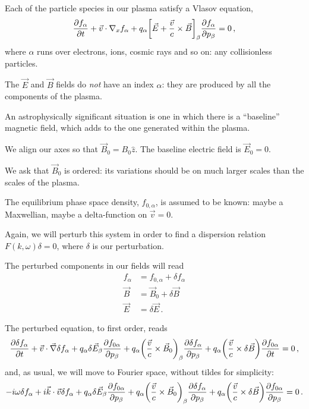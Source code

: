 \documentclass[main.tex]{subfiles}
\begin{document}

Each of the particle species in our plasma satisfy a Vlasov equation, 
%
\begin{align}
\pdv{f_\alpha }{t} + \vec{v} \cdot \nabla_x f_\alpha + q_\alpha \qty[ \vec{E} + \frac{\vec{v}}{c} \times \vec{B}]_\beta  \pdv{f_\alpha }{p_\beta } = 0
\,,
\end{align}
%
where \(\alpha \) runs over electrons, ions, cosmic rays and so on: any collisionless particles. 

The \(\vec{E}\) and \(\vec{B}\) fields do \emph{not} have an index \(\alpha\): they are produced by all the components of the plasma. 

An astrophysically significant situation is one in which there is a ``baseline'' magnetic field, which adds to the one generated within the plasma. 

We align our axes so that \(\vec{B}_0 = B_0  \hat{z}\). 
The baseline electric field is \(\vec{E}_0 = 0\). 

We ask that \(\vec{B}_0\) is ordered: its variations should be on much larger scales than the scales of the plasma. 

The equilibrium phase space density, \(f_{0, \alpha }\), is assumed to be known: maybe a Maxwellian, maybe a delta-function on \(\vec{v} = 0\). 

Again, we will perturb this system in order to find a dispersion relation \(F(k, \omega ) \delta = 0\), where \(\delta \) is our perturbation.

The perturbed components in our fields will read 
%
\begin{align}
f_\alpha &= f_{0, \alpha } + \delta f_\alpha  \\
\vec{B} &= \vec{B}_0 + \delta \vec{B}  \\
\vec{E} &= \delta \vec{E}
\,.
\end{align}

The perturbed equation, to first order, reads 
%
\begin{align}
\pdv{ \delta f_\alpha }{t} + \vec{v} \cdot \vec{\nabla} \delta f_\alpha + q_\alpha \delta \vec{E}_\beta \pdv{f_{0 \alpha }}{p_\beta } + q_\alpha \qty( \frac{\vec{v}}{c} \times \vec{B}_0)_\beta \pdv{ \delta f_\alpha }{p_\beta } 
+ q_\alpha \qty( \frac{\vec{v}}{c} \times \delta \vec{B}) \pdv{f_{0 \alpha }}{t} = 0
\,,
\end{align}
%
and, as usual, we will move to Fourier space, without tildes for simplicity: 
%
\begin{align} \label{eq:perturbed-fourier-space-vlasov}
- i \omega \delta f_\alpha 
+ i \vec{k} \cdot \vec{v} \delta f_\alpha 
+ q_\alpha \delta \vec{E}_\beta \pdv{f_{0 \alpha }}{p_\beta } 
+ q_\alpha \qty( \frac{\vec{v}}{c} \times \vec{B}_0)_\beta \pdv{ \delta f_\alpha }{p_\beta }
+ q_\alpha \qty( \frac{\vec{v}}{c} \times \delta \vec{B}) 
\pdv{f_{0 \alpha }}{p_\beta } = 0
\,.
\end{align}
\end{document}
